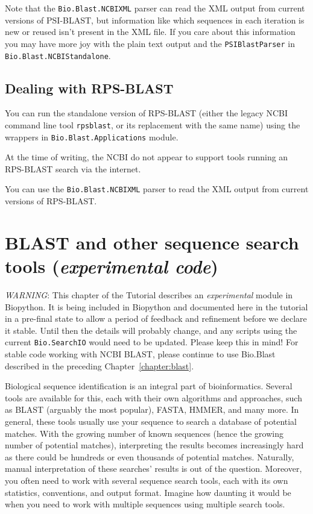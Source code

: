 \documentclass{report}
\begin{document}
Note that the \verb|Bio.Blast.NCBIXML| parser can read the XML output from
current versions of PSI-BLAST, but information like which sequences in each
iteration is new or reused isn't present in the XML file.
If you care about this information you may have more joy with the plain text
output and the \verb|PSIBlastParser| in \verb|Bio.Blast.NCBIStandalone|.

\section{Dealing with RPS-BLAST}

You can run the standalone version of RPS-BLAST (either the legacy NCBI
command line tool \verb|rpsblast|, or its replacement with the same name)
using the wrappers in \verb|Bio.Blast.Applications| module.

At the time of writing, the NCBI do not appear to support tools running an
RPS-BLAST search via the internet.

You can use the \verb|Bio.Blast.NCBIXML| parser to read the XML output from
current versions of RPS-BLAST.


\chapter{BLAST and other sequence search tools (\textit{experimental code})}
\label{chapter:searchio}

\emph{WARNING}: This chapter of the Tutorial describes an \emph{experimental}
module in Biopython. It is being included in Biopython and documented
here in  the tutorial in a pre-final state to allow a period of feedback
and refinement before we declare it stable. Until then the details will
probably change, and any scripts using the current \verb|Bio.SearchIO|
would need to be updated. Please keep this in mind! For stable code
working with NCBI BLAST, please continue to use Bio.Blast described
in the preceding Chapter~\ref{chapter:blast}.

Biological sequence identification is an integral part of bioinformatics.
Several tools are available for this, each with their own algorithms and
approaches, such as BLAST (arguably the most popular), FASTA, HMMER, and many
more. In general, these tools usually use your sequence to search a database of
potential matches. With the growing number of known sequences (hence the
growing number of potential matches), interpreting the results becomes
increasingly hard as there could be hundreds or even thousands of potential
matches. Naturally, manual interpretation of these searches' results is out of
the question. Moreover, you often need to work with several sequence search
tools, each with its own statistics, conventions, and output format. Imagine how
daunting it would be when you need to work with multiple sequences using
multiple search tools.
\end{document}
